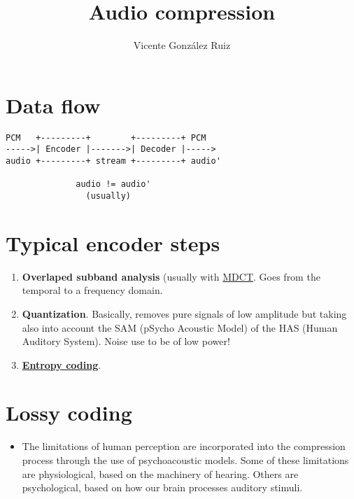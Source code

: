 
\title{Audio compression}

\author{Vicente González Ruiz}

\maketitle

\section{Data flow~\cite{sayood2017introduction}}

    \begin{verbatim}
PCM   +---------+        +---------+ PCM
----->| Encoder |------->| Decoder |----->
audio +---------+ stream +---------+ audio'

              audio != audio'
                (usually)
\end{verbatim}

\section{Typical encoder steps}
\begin{enumerate}
\def\labelenumi{\arabic{enumi}.}
\item
  \textbf{Overlaped subband analysis} (usually with
  \href{http://en.wikipedia.org/wiki/Modified_discrete_cosine_transform\%7D\%20(Modified\%20Discrete\%20Cosine\%20Transform)}{MDCT}.
  Goes from the temporal to a frequency domain.
\item
  \textbf{Quantization}. Basically, removes pure signals of low
  amplitude but taking also into account the SAM (pSycho Acoustic Model)
  of the HAS (Human Auditory System). Noise use to be of low power!
\item
  \href{https://vicente-gonzalez-ruiz.github.io/text_compression/}{\textbf{Entropy
  coding}}.
\end{enumerate}

\section{Lossy coding}
\begin{itemize}
\tightlist
\item
  The limitations of human perception are incorporated into the
  compression process through the use of psychoacoustic models. Some of
  these limitations are physiological, based on the machinery of
  hearing. Others are psychological, based on how our brain processes
  auditory stimuli.
\end{itemize}

